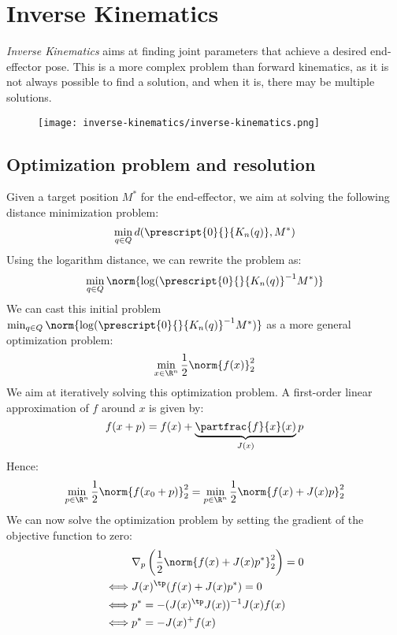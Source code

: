 \section{Inverse Kinematics}
\emph{Inverse Kinematics} aims at finding joint parameters that achieve a desired end-effector pose. This is a more complex problem than forward kinematics, as it is not always possible to find a solution, and when it is, there may be multiple solutions.
\begin{figure}[H]
    \centering
    \texttt{[image: inverse-kinematics/inverse-kinematics.png]}
\end{figure}

\subsection{Optimization problem and resolution}
Given a target position $M^*$ for the end-effector, we aim at solving the following distance minimization problem:
\begin{equation*}
    \min_{q\in Q} d(\prescript{0}{}{K_n(q)}, M^*)
\end{equation*}
Using the logarithm distance, we can rewrite the problem as:
\begin{equation}
    \min_{q\in Q} \norm{\log(\prescript{0}{}{K_n(q)}^{-1}M^*)}
\end{equation}
We can cast this initial problem $\min_{q\in Q} \norm{\log(\prescript{0}{}{K_n(q)}^{-1}M^*)}$ as a more general optimization problem:
\begin{equation*}
    \min_{x\in\R^n}\frac{1}{2}\norm{f(x)}_2^2
\end{equation*}
We aim at iteratively solving this optimization problem. A first-order linear approximation of $f$ around $x$ is given by:
\begin{equation*}
    f(x+p)=f(x)+\underbrace{\partfrac{f}{x}(x)}_{J(x)}p
\end{equation*}
Hence:
\begin{equation*}
    \min_{p\in\R^n}\frac{1}{2}\norm{f(x_0+p)}_2^2 = \min_{p\in\R^n}\frac{1}{2}\norm{f(x)+J(x)p}_2^2
\end{equation*}
We can now solve the optimization problem by setting the gradient of the objective function to zero:
\begin{equation*}
    \begin{aligned}
        &\nabla_p\left(\frac{1}{2}\norm{f(x)+J(x)p^*}_2^2\right)=0\\
        \iff &J(x)^\tp (f(x)+J(x)p^*) = 0\\
        \iff &p^* = -(J(x)^\tp J(x))^{-1}J(x) f(x)\\
        \iff &p^* = -J(x)^+ f(x)
    \end{aligned}
\end{equation*}
